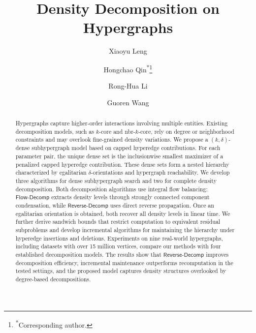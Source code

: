 \documentclass[twocolumn]{svjour3}
\newcommand{\kw}[1]{{\ensuremath{\mathsf{#1}}}\xspace}
\begin{document}
\title{Density Decomposition on Hypergraphs}
\author{Xiaoyu Leng \and Hongchao Qin\textsuperscript{*}\thanks{\textsuperscript{*}Corresponding author.} \and Rong-Hua Li \and Guoren Wang}
\date{}
\maketitle
\begin{abstract}
Hypergraphs capture higher-order interactions involving multiple entities. Existing decomposition models, such as $k$-core and nbr-$k$-core, rely on degree or neighborhood constraints and may overlook fine-grained density variations. We propose a $(k,\delta)$-dense subhypergraph model based on capped hyperedge contributions. For each parameter pair, the unique dense set is the inclusionwise smallest maximizer of a penalized capped hyperedge contribution. These dense sets form a nested hierarchy characterized by egalitarian $\delta$-orientations and hypergraph reachability. We develop three algorithms for dense subhypergraph search and two for complete density decomposition. Both decomposition algorithms use integral flow balancing: \kw{Flow\text{-}Decomp} extracts density levels through strongly connected component condensation, while \kw{Reverse\text{-}Decomp} uses direct reverse propagation. Once an egalitarian orientation is obtained, both recover all density levels in linear time. We further derive sandwich bounds that restrict computation to equivalent residual subproblems and develop incremental algorithms for maintaining the hierarchy under hyperedge insertions and deletions. Experiments on nine real-world hypergraphs, including datasets with over 15 million vertices, compare our methods with four established decomposition models. The results show that \kw{Reverse\text{-}Decomp} improves decomposition efficiency, incremental maintenance outperforms recomputation in the tested settings, and the proposed model captures density structures overlooked by degree-based decompositions.




\end{abstract}
\end{document}
